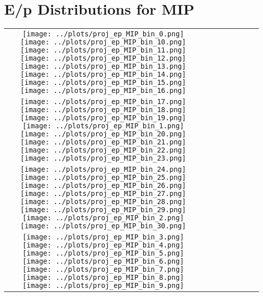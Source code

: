 \documentclass[a4paper,10pt]{article}
\begin{document}
\section*{E/p Distributions for MIP}
\begin{center}
\setlength{\tabcolsep}{2pt}
\renewcommand{\arraystretch}{1.0}
\begin{tabular}{cccccccc}
    \texttt{[image: ../plots/proj\_ep\_MIP\_bin\_0.png]} %
    \texttt{[image: ../plots/proj\_ep\_MIP\_bin\_10.png]} %
    \texttt{[image: ../plots/proj\_ep\_MIP\_bin\_11.png]} %
    \texttt{[image: ../plots/proj\_ep\_MIP\_bin\_12.png]} %
    \texttt{[image: ../plots/proj\_ep\_MIP\_bin\_13.png]} %
    \texttt{[image: ../plots/proj\_ep\_MIP\_bin\_14.png]} %
    \texttt{[image: ../plots/proj\_ep\_MIP\_bin\_15.png]} %
    \texttt{[image: ../plots/proj\_ep\_MIP\_bin\_16.png]} \\
    \texttt{[image: ../plots/proj\_ep\_MIP\_bin\_17.png]} %
    \texttt{[image: ../plots/proj\_ep\_MIP\_bin\_18.png]} %
    \texttt{[image: ../plots/proj\_ep\_MIP\_bin\_19.png]} %
    \texttt{[image: ../plots/proj\_ep\_MIP\_bin\_1.png]} %
    \texttt{[image: ../plots/proj\_ep\_MIP\_bin\_20.png]} %
    \texttt{[image: ../plots/proj\_ep\_MIP\_bin\_21.png]} %
    \texttt{[image: ../plots/proj\_ep\_MIP\_bin\_22.png]} %
    \texttt{[image: ../plots/proj\_ep\_MIP\_bin\_23.png]} \\
    \texttt{[image: ../plots/proj\_ep\_MIP\_bin\_24.png]} %
    \texttt{[image: ../plots/proj\_ep\_MIP\_bin\_25.png]} %
    \texttt{[image: ../plots/proj\_ep\_MIP\_bin\_26.png]} %
    \texttt{[image: ../plots/proj\_ep\_MIP\_bin\_27.png]} %
    \texttt{[image: ../plots/proj\_ep\_MIP\_bin\_28.png]} %
    \texttt{[image: ../plots/proj\_ep\_MIP\_bin\_29.png]} %
    \texttt{[image: ../plots/proj\_ep\_MIP\_bin\_2.png]} %
    \texttt{[image: ../plots/proj\_ep\_MIP\_bin\_30.png]} \\
    \texttt{[image: ../plots/proj\_ep\_MIP\_bin\_3.png]} %
    \texttt{[image: ../plots/proj\_ep\_MIP\_bin\_4.png]} %
    \texttt{[image: ../plots/proj\_ep\_MIP\_bin\_5.png]} %
    \texttt{[image: ../plots/proj\_ep\_MIP\_bin\_6.png]} %
    \texttt{[image: ../plots/proj\_ep\_MIP\_bin\_7.png]} %
    \texttt{[image: ../plots/proj\_ep\_MIP\_bin\_8.png]} %
    \texttt{[image: ../plots/proj\_ep\_MIP\_bin\_9.png]} %
\end{tabular}
\end{center}
\end{document}
